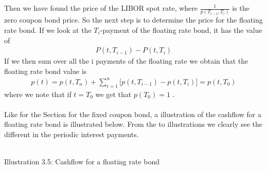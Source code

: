Then we have found the price of the LIBOR spot rate, where $\frac{1}{p(T_{i-1},T_i)}$ is the zero coupon bond price. 
So the next step is to determine the price for the floating rate bond. If we look at the $T_i$-payment of the floating rate bond, 
it has the value of
\begin{align*}
    P(t,T_{i-1})-P(t,T_i)
\end{align*}
If we then sum over all the i payments of the floating rate we obtain that the floating rate bond value is
\begin{align*}
    p(t)= p(t,T_n) + \sum_{i=1}^{n}\Big[p(t,T_{i-1})-p(t,T_i)\Big] = p(t,T_0) 
\end{align*}
where we note that if $t=T_0$ we get that $p(T_0)=1$ \cite{Bjork}. \\\\
Like for the Section for the fixed coupon bond, a illustration of the cashflow for a floating rate bond is illustrated below.
From the to illustrations we clearly see the different in the periodic interest payments. 
\begin{center}
    \\[10pt] 
    Illustration 3.5: Cashflow for a floating rate bond
\end{center}
\newpage
